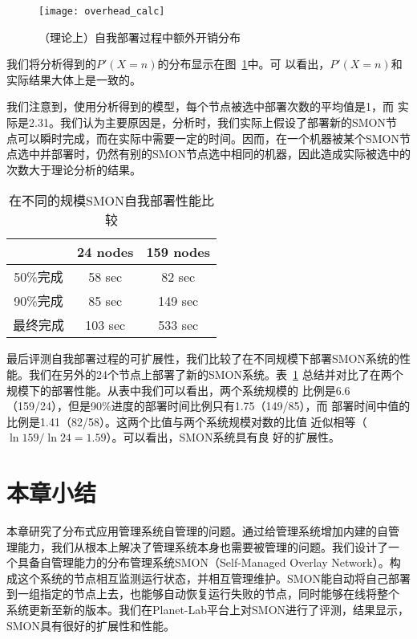 \begin{figure}
\centering
  \begin{minipage}{0.8\linewidth}
    \centering
    \texttt{[image: overhead\_calc]}
    \caption{（理论上）自我部署过程中额外开销分布}
    \label{fig:overhead_calc}
  \end{minipage}
\end{figure}

我们将分析得到的$P'(X=n)$的分布显示在图~\ref{fig:overhead_calc}中。可
以看出，$P'(X=n)$和实际结果大体上是一致的。

我们注意到，使用分析得到的模型，每个节点被选中部署次数的平均值是1，而
实际是2.31。我们认为主要原因是，分析时，我们实际上假设了部署新的SMON节
点可以瞬时完成，而在实际中需要一定的时间。因而，在一个机器被某个SMON节
点选中并部署时，仍然有别的SMON节点选中相同的机器，因此造成实际被选中的
次数大于理论分析的结果。


\begin{table}
\centering
  \begin{minipage}{0.8\linewidth}
    \centering
    \caption{在不同的规模SMON自我部署性能比较}
    \label{fig:scalability}
    \begin{tabular}{ccc}
    \toprule[1.5pt]
           & 24 nodes & 159 nodes\\
    \midrule[1pt]
    50\%完成 & 58 sec & 82 sec \\
    90\%完成 & 85 sec & 149 sec\\
    最终完成 & 103 sec & 533 sec\\
    \bottomrule[1.5pt]
    \end{tabular}
  \end{minipage}
\end{table}

最后评测自我部署过程的可扩展性，我们比较了在不同规模下部署SMON系统的性
能。我们在另外的24个节点上部署了新的SMON系统。表~\ref{fig:scalability}
总结并对比了在两个规模下的部署性能。从表中我们可以看出，两个系统规模的
比例是6.6（159/24），但是90\%进度的部署时间比例只有1.75（149/85），而
部署时间中值的比例是1.41（82/58）。这两个比值与两个系统规模对数的比值
近似相等（$\ln 159/\ln 24 = 1.59$）。可以看出，SMON系统具有良
好的扩展性。

\section{本章小结}
\label{sec:smon_conclusion}

本章研究了分布式应用管理系统自管理的问题。通过给管理系统增加内建的自管
理能力，我们从根本上解决了管理系统本身也需要被管理的问题。我们设计了一
个具备自管理能力的分布管理系统SMON（Self-Managed Overlay Network）。构
成这个系统的节点相互监测运行状态，并相互管理维护。SMON能自动将自己部署
到一组指定的节点上去，也能够自动恢复运行失败的节点，同时能够在线将整个
系统更新至新的版本。我们在Planet-Lab平台上对SMON进行了评测，结果显示，
SMON具有很好的扩展性和性能。
